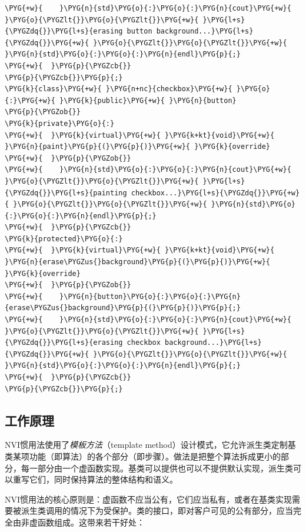 \begin{codeblockbg}
\begin{Verbatim}[commandchars=\\\{\},breaklines=true,breakanywhere=true,fontsize=\codefont,xleftmargin=17bp]
\PYG{+w}{    }\PYG{n}{std}\PYG{o}{:}\PYG{o}{:}\PYG{n}{cout}\PYG{+w}{ }\PYG{o}{\PYGZlt{}}\PYG{o}{\PYGZlt{}}\PYG{+w}{ }\PYG{l+s}{\PYGZdq{}}\PYG{l+s}{erasing button background...}\PYG{l+s}{\PYGZdq{}}\PYG{+w}{ }\PYG{o}{\PYGZlt{}}\PYG{o}{\PYGZlt{}}\PYG{+w}{ }\PYG{n}{std}\PYG{o}{:}\PYG{o}{:}\PYG{n}{endl}\PYG{p}{;}
\PYG{+w}{  }\PYG{p}{\PYGZcb{}}
\PYG{p}{\PYGZcb{}}\PYG{p}{;}
\PYG{k}{class}\PYG{+w}{ }\PYG{n+nc}{checkbox}\PYG{+w}{ }\PYG{o}{:}\PYG{+w}{ }\PYG{k}{public}\PYG{+w}{ }\PYG{n}{button}
\PYG{p}{\PYGZob{}}
\PYG{k}{private}\PYG{o}{:}
\PYG{+w}{  }\PYG{k}{virtual}\PYG{+w}{ }\PYG{k+kt}{void}\PYG{+w}{ }\PYG{n}{paint}\PYG{p}{(}\PYG{p}{)}\PYG{+w}{ }\PYG{k}{override}
\PYG{+w}{  }\PYG{p}{\PYGZob{}}
\PYG{+w}{    }\PYG{n}{std}\PYG{o}{:}\PYG{o}{:}\PYG{n}{cout}\PYG{+w}{ }\PYG{o}{\PYGZlt{}}\PYG{o}{\PYGZlt{}}\PYG{+w}{ }\PYG{l+s}{\PYGZdq{}}\PYG{l+s}{painting checkbox...}\PYG{l+s}{\PYGZdq{}}\PYG{+w}{ }\PYG{o}{\PYGZlt{}}\PYG{o}{\PYGZlt{}}\PYG{+w}{ }\PYG{n}{std}\PYG{o}{:}\PYG{o}{:}\PYG{n}{endl}\PYG{p}{;}
\PYG{+w}{  }\PYG{p}{\PYGZcb{}}
\PYG{k}{protected}\PYG{o}{:}
\PYG{+w}{  }\PYG{k}{virtual}\PYG{+w}{ }\PYG{k+kt}{void}\PYG{+w}{ }\PYG{n}{erase\PYGZus{}background}\PYG{p}{(}\PYG{p}{)}\PYG{+w}{ }\PYG{k}{override}
\PYG{+w}{  }\PYG{p}{\PYGZob{}}
\PYG{+w}{    }\PYG{n}{button}\PYG{o}{:}\PYG{o}{:}\PYG{n}{erase\PYGZus{}background}\PYG{p}{(}\PYG{p}{)}\PYG{p}{;}
\PYG{+w}{    }\PYG{n}{std}\PYG{o}{:}\PYG{o}{:}\PYG{n}{cout}\PYG{+w}{ }\PYG{o}{\PYGZlt{}}\PYG{o}{\PYGZlt{}}\PYG{+w}{ }\PYG{l+s}{\PYGZdq{}}\PYG{l+s}{erasing checkbox background...}\PYG{l+s}{\PYGZdq{}}\PYG{+w}{ }\PYG{o}{\PYGZlt{}}\PYG{o}{\PYGZlt{}}\PYG{+w}{ }\PYG{n}{std}\PYG{o}{:}\PYG{o}{:}\PYG{n}{endl}\PYG{p}{;}
\PYG{+w}{  }\PYG{p}{\PYGZcb{}}
\PYG{p}{\PYGZcb{}}\PYG{p}{;}
\end{Verbatim}
\end{codeblockbg}



\subsection{工作原理}



NVI惯用法使用了\textit{模板方法}（template method）设计模式，它允许派生类定制基类某项功能（即算法）的各个部分（即步骤）。做法是把整个算法拆成更小的部分，每一部分由一个虚函数实现。基类可以提供也可以不提供默认实现，派生类可以重写它们，同时保持算法的整体结构和语义。



NVI惯用法的核心原则是：虚函数不应当公有，它们应当私有，或者在基类实现需要被派生类调用的情况下为受保护。类的接口，即对客户可见的公有部分，应当完全由非虚函数组成。这带来若干好处：


